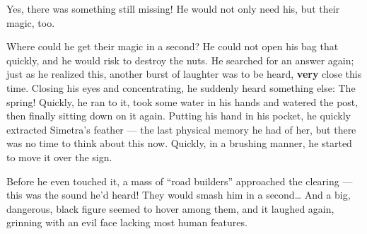 Yes, there was something still missing! He would not only need his, but their magic, too.

Where could he get their magic in a second? He could not open his bag that quickly, and he would risk to destroy the nuts. He searched for an answer again; just as he realized this, another burst of laughter was to be heard, \textbf{very} close this time. 
Closing his eyes and concentrating, he suddenly heard something else: The spring! Quickly, he ran to it, took some water in his hands and watered the post, then finally sitting down on it again. Putting his hand in his pocket, he quickly extracted Simetra's feather --- the last physical memory he had of her, but there was no time to think about this now. Quickly, in a brushing manner, he started to move it over the sign.

Before he even touched it, a mass of \enquote{road builders} approached the clearing --- this was the sound he'd heard! They would smash him in a second\dots
And a big, dangerous, black figure seemed to hover among them, and it laughed again, grinning with an evil face lacking most human features.
